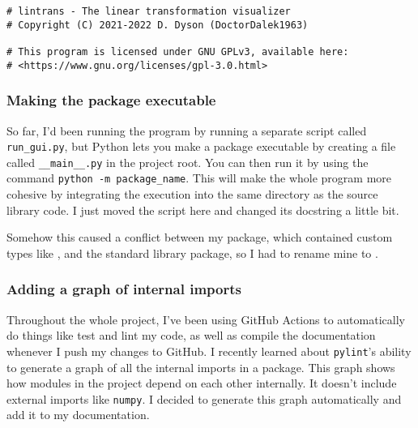 \documentclass[../development.tex]{subfiles}
\begin{document}
\begin{verbatim}
# lintrans - The linear transformation visualizer
# Copyright (C) 2021-2022 D. Dyson (DoctorDalek1963)

# This program is licensed under GNU GPLv3, available here:
# <https://www.gnu.org/licenses/gpl-3.0.html>
\end{verbatim}

\subsubsection{Making the package executable\label{development:fumbling-with-semver:making-the-package-executable}}

So far, I'd been running the program by running a separate script called \texttt{run\_gui.py}, but Python lets you make a package executable by creating a file called \texttt{\_\_main\_\_.py} in the project root. You can then run it by using the command \texttt{python -m package_name}. This will make the whole program more cohesive by integrating the execution into the same directory as the source library code. I just moved the script here and changed its docstring a little bit.


Somehow this caused a conflict between my  package, which contained custom types like , and the standard library  package, so I had to rename mine to .

\subsubsection{Adding a graph of internal imports\label{development:fumbling-with-semver:adding-a-graph-of-internal-imports}}

Throughout the whole project, I've been using GitHub Actions\cite{github-actions-docs} to automatically do things like test and lint my code, as well as compile the documentation whenever I push my changes to GitHub. I recently learned about \texttt{pylint}'s ability to generate a graph of all the internal imports in a package\cite{pylint-2.12.2-graph-docs}. This graph shows how modules in the project depend on each other internally. It doesn't include external imports like \texttt{numpy}. I decided to generate this graph automatically and add it to my documentation.
\end{document}
